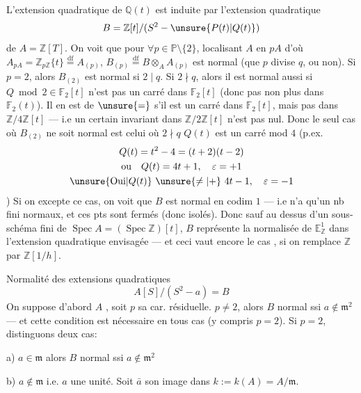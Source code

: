 L'extension quadratique de $\mathbb Q(t)$ est induite par
l'extension quadratique
\[
B=\mathbb Z[t]/(S^2-\unsure{P(t)|Q(t)})
\]
de $A=\mathbb Z[T]$. On voit que pour $\forall p\in\mathbb P\setminus\{2\}$,
localisant $A$ en $pA$ d'où $A_{pA}=\mathbb Z_{p\mathbb Z}\{t\}\overset{\mathrm{df}}=A_{(p)}$,
 $B_{(p)}\overset{\mathrm{df}}=B\otimes_A A_{(p)}$ est normal (que $p$ divise $q$, ou non).
Si $p=2$, alors $B_{(2)}$ est normal si $2\mid q$. Si $2\nmid q$, alors
il est normal aussi si $Q\bmod 2\in\mathbb F_2[t]$ n'est pas un carré
dans $\mathbb F_2[t]$ (donc pas non plus dans $\mathbb F_2(t)$).  Il en est
de $\unsure{=}$ s'il est un carré dans $\mathbb F_2[t]$, mais pas dans
$\mathbb Z/4\mathbb Z[t]$ --- i.e un certain invariant dans $\mathbb Z/2\mathbb Z[t]$ n'est pas nul.
Donc le seul cas où $B_{(2)}$ ne soit normal est celui où $2\nmid q$
 $Q(t)$ est un carré mod $4$ (p.ex.
\[
\begin{gathered}
Q(t)=t^2-4=(t+2)(t-2)\\
\text{ou}\quad Q(t)=4t+1,\quad\varepsilon=+1\\
\unsure{\text{Oui}|Q(t)}\ \unsure{\ne|+}\ 4t-1,\quad\varepsilon=-1
\end{gathered}
\]
)
Si on excepte ce cas, on voit que $B$ est normal en
codim $1$ --- i.e  n'a qu'un nb fini
 
normaux, et ces pts sont fermés (donc isolés). Donc  sauf
 au dessus d'un sous-schéma fini de $\operatorname{Spec}A=(\operatorname{Spec}\mathbb Z)[t]$,
$B$ représente la normalisée de $\mathbb E^1_{\mathbb Z}$ dans l'extension
quadratique envisagée --- et ceci vaut encore le cas
, si on remplace $\mathbb Z$ par $\mathbb Z[1/h]$.

Normalité des extensions quadratiques
\[
A[S]/(S^2-a)=B
\]
On suppose d'abord $A$ , soit $p$ sa car. résiduelle.
$p\ne2$, alors $B$ normal ssi $a\notin\mathfrak m^2$ --- et cette condition
est nécessaire en tous cas (y compris $p=2$). Si $p=2$, distinguons
deux cas:


a) $a\in\mathfrak m$ alors $B$ normal ssi $a\notin\mathfrak m^2$

b) $a\notin\mathfrak m$ i.e. $a$ une unité. Soit $\bar a$ son image dans
$k:=k(A)=A/\mathfrak m$.

